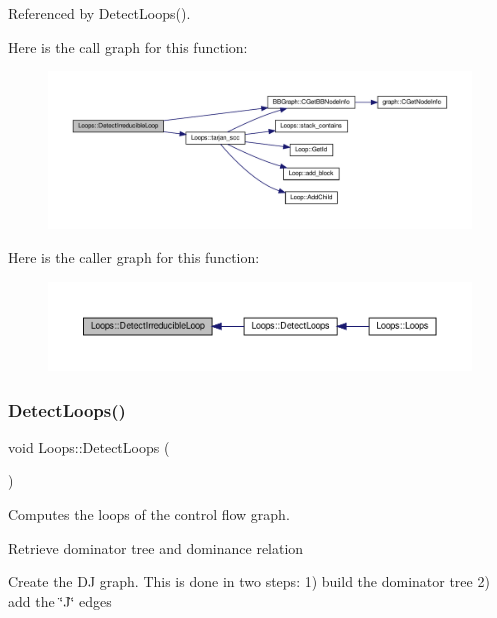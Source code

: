 Referenced by Detect\+Loops().

Here is the call graph for this function\+:
\nopagebreak
\begin{figure}[H]
\begin{center}
\leavevmode
\includegraphics[width=350pt]{d3/ded/classLoops_aac2e78898f8485a50d57e97b9e474dd4_cgraph}
\end{center}
\end{figure}
Here is the caller graph for this function\+:
\nopagebreak
\begin{figure}[H]
\begin{center}
\leavevmode
\includegraphics[width=350pt]{d3/ded/classLoops_aac2e78898f8485a50d57e97b9e474dd4_icgraph}
\end{center}
\end{figure}
\mbox{\label{classLoops_ab4e1b49b594312ae244e75093833b672}} 
\subsubsection{\texorpdfstring{Detect\+Loops()}{DetectLoops()}}
{\footnotesize\ttfamily void Loops\+::\+Detect\+Loops (\begin{DoxyParamCaption}{ }\end{DoxyParamCaption})\hspace{0.3cm}{\ttfamily [private]}}



Computes the loops of the control flow graph. 

Retrieve dominator tree and dominance relation

Create the DJ graph. This is done in two steps\+: 1) build the dominator tree 2) add the \char`\"{}\+J\char`\"{} edges

